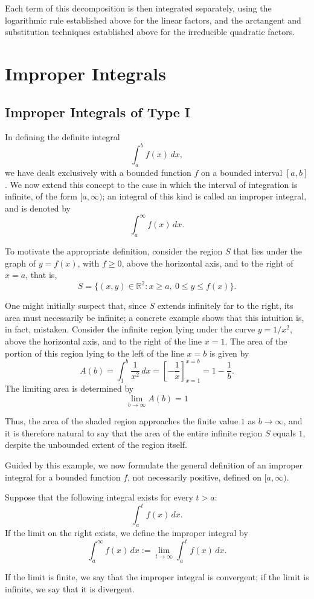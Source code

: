 Each term of this decomposition is then integrated separately, using the logarithmic rule established above for the linear factors, and the arctangent and substitution techniques established above for the irreducible quadratic factors.

\section{Improper Integrals}

\subsection{Improper Integrals of Type I}

In defining the definite integral \[
\int_a^b f(x) \, dx,
\] we have dealt exclusively with a bounded function $f$ on a bounded interval $[a,b]$. We now extend this concept to the case in which the interval of integration is infinite, of the form $[a, \infty)$; an integral of this kind is called an improper integral, and is denoted by
\[
\int_a^{\infty} f(x) \, dx.
\]

To motivate the appropriate definition, consider the region $S$ that lies under the graph of $y = f(x)$, with $f \geq 0$, above the horizontal axis, and to the right of $x = a$, that is,
\[
S = \{ (x,y) \in \mathbb{R}^2 : x \geq a, \ 0 \leq y \leq f(x) \}.
\]

One might initially suspect that, since $S$ extends infinitely far to the right, its area must necessarily be infinite; a concrete example shows that this intuition is, in fact, mistaken. Consider the infinite region lying under the curve $y = 1/x^2$, above the horizontal axis, and to the right of the line $x = 1$. The area of the portion of this region lying to the left of the line $x = b$ is given by
\[
A(b) = \int_1^b \frac{1}{x^2} \, dx = \left[ -\frac{1}{x} \right]_{x=1}^{x=b} = 1 - \frac{1}{b}.
\]
The limiting area is determined by
\[
\lim_{b \to \infty} A(b) = 1
\]

Thus, the area of the shaded region approaches the finite value $1$ as $b \to \infty$, and it is therefore natural to say that the area of the entire infinite region $S$ equals $1$, despite the unbounded extent of the region itself.

Guided by this example, we now formulate the general definition of an improper integral for a bounded function $f$, not necessarily positive, defined on $[a, \infty)$.

\begin{definition}
Suppose that the following integral exists for every $t > a$:
\[
\int_a^t f(x) \, dx.
\]
If the limit on the right exists, we define the improper integral by
\[
\int_a^{\infty} f(x) \, dx := \lim_{t \to \infty} \int_a^t f(x) \, dx.
\]

If the limit is finite, we say that the improper integral is convergent; if the limit is infinite, we say that it is divergent.
\end{definition}

